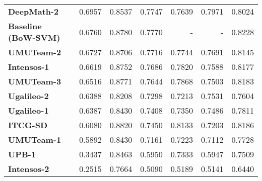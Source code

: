 \begin{table}[H]
\begin{tabular}{lrrrrrr}
        \textbf{DeepMath-2}         & 0.6957                & 0.8537                    & 0.7747            & 0.7639             & 0.7971          & 0.8024            \\[0.05cm]
        \textbf{Baseline (BoW-SVM)} & 0.6760                & 0.8780                    & 0.7770            & -                  & -               & 0.8228            \\[0.05cm]
        \textbf{UMUTeam-2}          & 0.6727                & 0.8706                    & 0.7716            & 0.7744             & 0.7691          & 0.8145            \\[0.05cm]
        \textbf{Intensos-1}         & 0.6619                & 0.8752                    & 0.7686            & 0.7820             & 0.7588          & 0.8177            \\[0.05cm]
        \textbf{UMUTeam-3}          & 0.6516                & 0.8771                    & 0.7644            & 0.7868             & 0.7503          & 0.8183            \\[0.05cm]
        \textbf{Ugalileo-2}         & 0.6388                & 0.8208                    & 0.7298            & 0.7213             & 0.7531          & 0.7604            \\[0.05cm]
        \textbf{Ugalileo-1}         & 0.6387                & 0.8430                    & 0.7408            & 0.7350             & 0.7486          & 0.7811            \\[0.05cm]
        \textbf{ITCG-SD}            & 0.6080                & 0.8820                    & 0.7450            & 0.8133             & 0.7203          & 0.8186            \\[0.05cm]
        \textbf{UMUTeam-1}          & 0.5892                & 0.8430                    & 0.7161            & 0.7223             & 0.7112          & 0.7728            \\[0.05cm]
        \textbf{UPB-1}              & 0.3437                & 0.8463                    & 0.5950            & 0.7333             & 0.5947          & 0.7509            \\[0.05cm]
        \textbf{Intensos-2}         & 0.2515                & 0.7664                    & 0.5090            & 0.5189             & 0.5141          & 0.6440            \\[0.05cm] \hline
    \end{tabular}
\end{table}